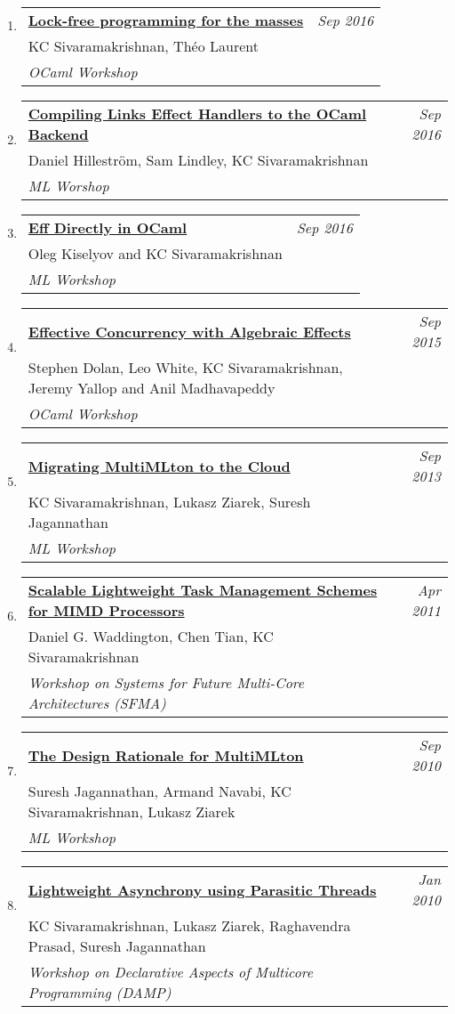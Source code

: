 \documentclass[10pt]{article}
\makeatletter
\newcommand{\lbar}[1]{{\color{#1}\ding{118}}\hspace*{2pt}}
\newenvironment{benumerate}[2]{
    \let\oldItem\item
    \def\item{\addtocounter{enumi}{-2}\oldItem}
    \begin{enumerate}[#2] \itemsep3pt
    \setcounter{enumi}{#1}
    \addtocounter{enumi}{1}}
  {\end{enumerate}}
\newenvironment{publication}[5]
{ \item
  \begin{tabular*}{7.5in}{p{6.3in}@{\extracolsep{\fill}}r}
    \href{#1}{\textbf{#2}} & \textit{#3}\\ #4 &\\ \textit{#5}&\\
  \end{tabular*}
} {}
\newenvironment{region}[3]{%
  \vspace*{0.5ex}
  {\scalebox{1.4}{\textbf{#1}}}
  \begin{benumerate}{#3}{\color{RoyalBlue}#2}}
  {\end{benumerate}\vspace{0.8ex}}
\makeatother
\begin{document}
\begin{region} {\lbar{purple}Workshop Publications}{{W}1}{4}

	\begin{publication}{http://kcsrk.info/papers/reagents_ocaml16.pdf}
		{Lock-free programming for the masses}
		{Sep 2016}{KC Sivaramakrishnan, Théo Laurent}
		{OCaml Workshop}
	\end{publication}

	\begin{publication}{http://kcsrk.info/papers/links_ocaml_ml16.pdf}
		{Compiling Links Effect Handlers to the OCaml Backend}
		{Sep 2016}{Daniel Hilleström, Sam Lindley, KC Sivaramakrishnan}
		{ML Worshop}
	\end{publication}

	\begin{publication}{http://kcsrk.info/papers/eff_ocaml_ml16.pdf}
		{Eff Directly in OCaml}
		{Sep 2016}{Oleg Kiselyov and KC Sivaramakrishnan}
		{ML Workshop}
	\end{publication}

	\begin{publication}{http://kcsrk.info/papers/effects_ocaml15.pdf}
		{Effective Concurrency with Algebraic Effects}
		{Sep 2015}{Stephen Dolan, Leo White, KC Sivaramakrishnan, Jeremy Yallop and Anil Madhavapeddy}
		{OCaml Workshop}
	\end{publication}

	\begin{publication}{http://kcsrk.info/papers/mmcloud_mlw13.pdf}
		{Migrating MultiMLton to the Cloud}
		{Sep 2013}{KC Sivaramakrishnan, Lukasz Ziarek, Suresh Jagannathan}
		{ML Workshop}
	\end{publication}

	\begin{publication}{http://kcsrk.info/papers/snapple_sfma11.pdf}
		{Scalable Lightweight Task Management Schemes for MIMD Processors}
		{Apr 2011}{Daniel G. Waddington, Chen Tian, KC Sivaramakrishnan}
		{Workshop on Systems for Future Multi-Core Architectures (SFMA)}
	\end{publication}

	\begin{publication}{http://kcsrk.info/papers/multimlton_mlw10.pdf}
		{The Design Rationale for MultiMLton}
		{Sep 2010}{Suresh Jagannathan, Armand Navabi, KC Sivaramakrishnan, Lukasz Ziarek}
		{ML Workshop}
	\end{publication}

	\begin{publication}{http://kcsrk.info/papers/parasites_damp10.pdf}
		{Lightweight Asynchrony using Parasitic Threads}
		{Jan 2010}{KC Sivaramakrishnan, Lukasz Ziarek, Raghavendra Prasad, Suresh Jagannathan}
		{Workshop on Declarative Aspects of Multicore Programming (DAMP)}
	\end{publication}
\end{region}
\end{document}
